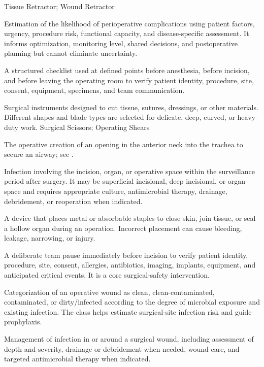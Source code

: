 \synonyms
Tissue Retractor; Wound Retractor

 Estimation of the likelihood of perioperative complications using patient factors,
urgency, procedure risk, functional capacity, and disease-specific assessment. It
informs optimization, monitoring level, shared decisions, and postoperative planning but
cannot eliminate uncertainty.

 A structured checklist used at defined points before anesthesia, before incision, and
before leaving the operating room to verify patient identity, procedure, site, consent,
equipment, specimens, and team communication.

 Surgical instruments designed to cut tissue, sutures, dressings, or other materials. Different shapes and blade types are selected for delicate, deep, curved, or heavy-duty work.
\synonyms
Surgical Scissors; Operating Shears

 The operative creation of an opening in the anterior neck into the trachea to secure an airway; see .

 Infection involving the incision, organ, or operative space within the surveillance
period after surgery. It may be superficial incisional, deep incisional, or organ-space
and requires appropriate culture, antimicrobial therapy, drainage, debridement, or
reoperation when indicated.

 A device that places metal or absorbable staples to close skin, join tissue, or seal a hollow organ during an operation. Incorrect placement can cause bleeding, leakage, narrowing, or injury.

 A deliberate team pause immediately before incision to verify patient identity,
procedure, site, consent, allergies, antibiotics, imaging, implants, equipment, and
anticipated critical events. It is a core surgical-safety intervention.

 Categorization of an operative wound as clean, clean-contaminated, contaminated, or
dirty/infected according to the degree of microbial exposure and existing infection. The
class helps estimate surgical-site infection risk and guide prophylaxis.

 Management of infection in or around a surgical wound, including assessment of depth and severity, drainage or debridement when needed, wound care, and targeted antimicrobial therapy when indicated.

